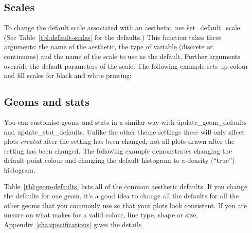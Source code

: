 \subsection{Scales}
\label{sub:customise-scales}

To change the default scale associated with an aesthetic, use \f{set_default_scale}. (See Table~\ref{tbl:default-scales} for the defaults.)  This function takes three arguments: the name of the aesthetic, the type of variable (discrete or continuous) and the name of the scale to use as the default.  Further arguments override the default parameters of the scale.  The following example sets up colour and fill scales for black and white printing:

% 


\subsection{Geoms and stats}
\label{sub:geoms_and_stats}

You can customise geoms and stats in a similar way with \f{update_geom_defaults} and \f{update_stat_defaults}.  Unlike the other theme settings these will only affect plots \emph{created} after the setting has been changed, not all plots drawn after the setting has been changed.  The following example demonstrates changing the default point colour and changing the default histogram to a density (``true'') histogram.  

% 


Table~\ref{tbl:geom-defaults} lists all of the common aesthetic defaults.  If you change the defaults for one geom, it's a good idea to change all the defaults for all the other geoms that you commonly use so that your plots look consistent.  If you are unsure on what makes for a valid colour, line type, shape or size, Appendix~\ref{cha:specifications} gives the details.

% 


